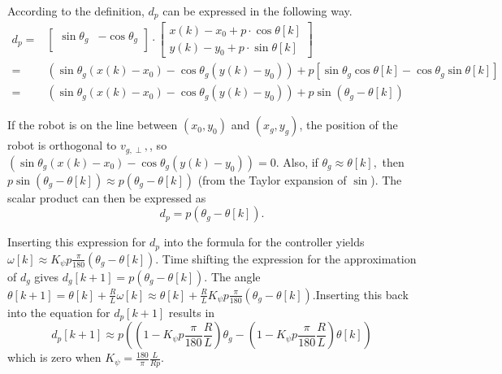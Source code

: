 According to the definition, $d_p$ can be expressed in the following way.
\begin{equation}
\begin{aligned}
    d_p = & 
    \begin{bmatrix}
    \sin{\theta_g} & -\cos{\theta_g} \\
    \end{bmatrix} \cdot  
    \begin{bmatrix}
    x(k) - x_0 + p \cdot \cos{\theta[k]} \\
    y(k) - y_0 + p \cdot \sin{\theta[k]} 
    \end{bmatrix} \\
    = & (\sin{\theta_g}(x(k) - x_0) - \cos{\theta_g}(y(k) - y_0)) + p[\sin{\theta_g}\cos{\theta[k]} - \cos{\theta_g}\sin{\theta[k]}] \\
    = & (\sin{\theta_g}(x(k) - x_0) - \cos{\theta_g}(y(k) - y_0)) + p \sin{(\theta_g-\theta[k])}
\end{aligned}
\end{equation}

If the robot is on the line between $(x_0, y_0)$ and $(x_g, y_g)$, the position of the robot is orthogonal to $v_{g,\perp},$, so $(\sin{\theta_g}(x(k) - x_0) - \cos{\theta_g}(y(k) - y_0)) = 0.$ Also, if $\theta_g \approx \theta[k],$ then $p \sin{(\theta_g-\theta[k])} \approx p (\theta_g-\theta[k])$ (from the Taylor expansion of $\sin$). The scalar product can then be expressed as 
\[
d_p = p(\theta_g - \theta[k]).
\]

Inserting this expression for $d_p$ into the formula for the controller yields $\omega[k] \approx K_\psi p \frac{\pi}{180} (\theta_g - \theta[k]).$ Time shifting the expression for the approximation of $d_g$ gives $d_g[k+1] = p(\theta_g - \theta[k]).$ The angle $\theta[k+1] = \theta[k] + \frac{R}{L} \omega[k] \approx \theta[k] + \frac{R}{L}K_\psi p  \frac{\pi}{180}(\theta_g - \theta[k]).$Inserting this back into the equation for $d_p[k+1]$ results in
\[
    d_p[k+1] \approx p ( (1-K_\psi p  \frac{\pi}{180}\frac{R}{L}) \theta_g - (1 - K_\psi p  \frac{\pi}{180} \frac{R}{L}) \theta[k])
\]
which is zero when $K_\psi =  \frac{180}{\pi}\frac{L}{Rp}.$

